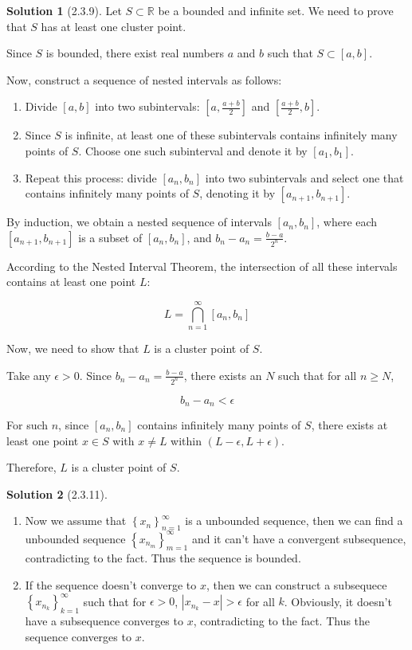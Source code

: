\documentclass{article}
\theoremstyle{definition}
\newtheorem{sol}{Solution}[exe]
\begin{document}
\begin{sol}[2.3.9]


    Let $S \subset \mathbb{R}$ be a bounded and infinite set. We need to prove that $S$ has at least one cluster point.

    Since $S$ is bounded, there exist real numbers $a$ and $b$ such that $S \subset [a, b]$.
    
    Now, construct a sequence of nested intervals as follows:
    
    \begin{enumerate}
        \item Divide $[a, b]$ into two subintervals: $[a, \frac{a+b}{2}]$ and $[\frac{a+b}{2}, b]$.
        \item Since $S$ is infinite, at least one of these subintervals contains infinitely many points of $S$. Choose one such subinterval and denote it by $[a_1, b_1]$.
        \item Repeat this process: divide $[a_n, b_n]$ into two subintervals and select one that contains infinitely many points of $S$, denoting it by $[a_{n+1}, b_{n+1}]$.
    \end{enumerate}
    
    By induction, we obtain a nested sequence of intervals $[a_n, b_n]$, where each $[a_{n+1}, b_{n+1}]$ is a subset of $[a_n, b_n]$, and $b_n - a_n = \frac{b-a}{2^n}$.
    
    According to the Nested Interval Theorem, the intersection of all these intervals contains at least one point $L$:
    
    \[ L = \bigcap_{n=1}^{\infty} [a_n, b_n] \]
    
    Now, we need to show that $L$ is a cluster point of $S$.
    
    Take any $\epsilon > 0$. Since $b_n - a_n = \frac{b-a}{2^n}$, there exists an $N$ such that for all $n \geq N$,
    
    \[ b_n - a_n < \epsilon \]
    
    For such $n$, since $[a_n, b_n]$ contains infinitely many points of $S$, there exists at least one point $x \in S$ with $x \neq L$ within $(L - \epsilon, L + \epsilon)$.
    
Therefore, $L$ is a cluster point of $S$.
\end{sol}

\begin{sol}[2.3.11]
\begin{enumerate}[label=\alph*]
\item Now we assume that $\left\{x_{n}\right\}_{n=1}^{\infty}$ is a unbounded sequence, then we can find a unbounded sequence $\left\{x_{n_{m}}\right\}_{m=1}^{\infty}$ and it can't have a convergent subsequence, contradicting to the fact. Thus the sequence is bounded.
\item If the sequence doesn't converge to $x$, then we can construct a subsequece $\left\{x_{n_{k}}\right\}_{k=1}^{\infty}$ such that for $\epsilon>0$, $|x_{n_{k}}-x|>\epsilon$ for all $k$. Obviously, it doesn't have a subsequence converges to $x$, contradicting to the fact. Thus the sequence converges to $x$.
\end{enumerate}

\end{sol}
\end{document}
